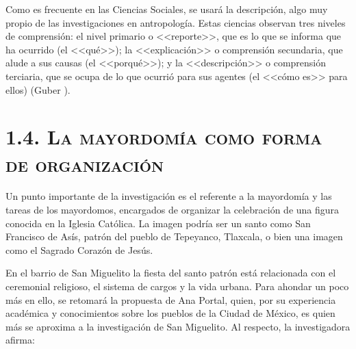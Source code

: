 \documentclass[14pt,letterpaper,twoside]{extbook} %
\begin{document}
\noindent Como es frecuente en las Ciencias Sociales, se usará la descripción, algo muy propio de las investigaciones en antropología. Estas ciencias observan tres niveles de comprensión: el nivel primario o <<reporte>>, que es lo que se informa que ha ocurrido (el <<qué>>); la <<explicación>> o comprensión secundaria, que alude a sus causas (el <<porqué>>); y la <<descripción>> o comprensión terciaria, que se ocupa de lo que ocurrió para sus agentes (el <<cómo es>> para ellos) (Guber ).

\section*{\mdseries\large\textsc{1.4. La mayordomía como forma de organización}}

\noindent Un punto importante de la investigación es el referente a la mayordomía y las tareas de los mayordomos, encargados de organizar la celebración de una figura conocida en la Iglesia Católica. La imagen podría ser un santo como San Francisco de Asís, patrón del pueblo de Tepeyanco, Tlaxcala, o bien una imagen como el Sagrado Corazón de Jesús.

En el barrio de San Miguelito la fiesta del santo patrón está relacionada con el ceremonial religioso, el sistema de cargos y la vida urbana. Para ahondar un poco más en ello, se retomará la propuesta de Ana Portal, quien, por su experiencia académica y conocimientos sobre los pueblos de la Ciudad de México, es quien más se aproxima a la investigación de San Miguelito. Al respecto, la investigadora afirma:
\end{document}
